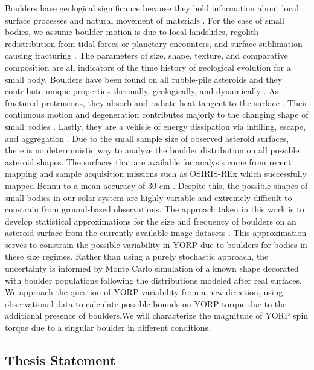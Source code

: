 Boulders have geological significance because they hold information about local surface processes and natural movement of materials \cite{Murdoch2015}. For the case of small bodies, we assume boulder motion is due to local landslides, regolith redistribution from tidal forces or planetary encounters, and surface sublimation causing fracturing \cite{Delbo2022} \cite{Barnouin2022}. The parameters of size, shape, texture, and comparative composition are all indicators of the time history of geological evolution for a small body. Boulders have been found on all rubble-pile asteroids and they contribute unique properties thermally, geologically, and dynamically \cite{Kuppers2012}. As fractured protrusions, they absorb and radiate heat tangent to the surface \cite{Golubov2022}. Their continuous motion and degeneration contributes majorly to the changing shape of small bodies \cite{Molaro2020} \cite{Scheeres2015}\cite{Scheeres2018}\cite{Zhang2022}. Lastly, they are a vehicle of energy dissipation via infilling, escape, and aggregation \cite{Holsapple2010}.
Due to the small sample size of observed asteroid surfaces, there is no deterministic way to analyze the boulder distribution on all possible asteroid shapes. The surfaces that are available for analysis come from recent mapping and sample acquisition missions such as OSIRIS-REx which successfully mapped Bennu to a mean accuracy of 30 cm \cite{Bennett2021}. Despite this, the possible shapes of small bodies in our solar system are highly variable and extremely difficult to constrain from ground-based observations. The approach taken in this work is to develop statistical approximations for the size and frequency of boulders on an asteroid surface from the currently available image datasets \cite{DellaGiustina2019}\cite{Fujiwara2006}\cite{Watanabe2019}. This approximation serves to constrain the possible variability in YORP due to boulders for bodies in these size regimes. Rather than using a purely stochastic approach, the uncertainty is informed by Monte Carlo simulation of a known shape decorated with boulder populations following the distributions modeled after real surfaces. We approach the question of YORP variability from a new direction, using observational data to calculate possible bounds on YORP torque due to the additional presence of boulders.We will characterize the magnitude of YORP spin torque due to a singular boulder in different conditions.
\subsection{Thesis Statement}

